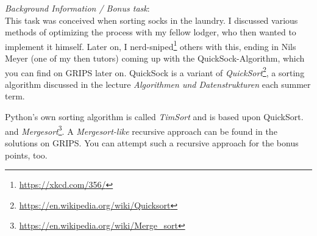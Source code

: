 \documentclass[
	ngerman,
	fontsize=10pt,
	parskip=half,
	titlepage=true,
	DIV=12
]{scrartcl}
\begin{document}
\emph{Background Information / Bonus task}:\\
This task was conceived when sorting socks in the laundry. I discussed various methods of optimizing the process with my fellow lodger, who then wanted to implement it himself. Later on, I nerd-sniped\footnote{\url{https://xkcd.com/356/}} others with this, ending in Nils Meyer (one of my then tutors) coming up with the QuickSock-Algorithm, which you can find on GRIPS later on. QuickSock is a variant of \emph{QuickSort}\footnote{\url{https://en.wikipedia.org/wiki/Quicksort}}, a sorting algorithm discussed in the lecture \emph{Algorithmen und Datenstrukturen} each summer term.

Python's own sorting algorithm is called \emph{TimSort} and is based upon QuickSort. and \emph{Mergesort}\footnote{\url{https://en.wikipedia.org/wiki/Merge_sort}}. A \emph{Mergesort-like} recursive approach can be found in the solutions on GRIPS. You can attempt such a recursive approach for the bonus points, too.
\end{document}
